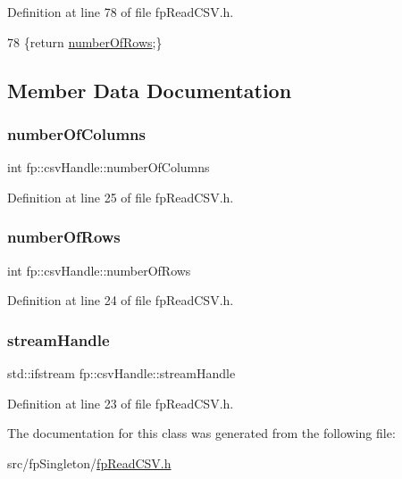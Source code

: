 Definition at line 78 of file fp\+Read\+C\+S\+V.\+h.


\begin{DoxyCode}
78 \{\textcolor{keywordflow}{return} \hyperlink{classfp_1_1csvHandle_a07cf6b14355c5fa81643a7bb6e9c681f}{numberOfRows};\}
\end{DoxyCode}


\subsection{Member Data Documentation}
\mbox{\label{classfp_1_1csvHandle_ae3e5280846df348d0b1b86b78f2e3682}} 
\subsubsection{\texorpdfstring{number\+Of\+Columns}{numberOfColumns}}
{\footnotesize\ttfamily int fp\+::csv\+Handle\+::number\+Of\+Columns\hspace{0.3cm}{\ttfamily [private]}}



Definition at line 25 of file fp\+Read\+C\+S\+V.\+h.

\mbox{\label{classfp_1_1csvHandle_a07cf6b14355c5fa81643a7bb6e9c681f}} 
\subsubsection{\texorpdfstring{number\+Of\+Rows}{numberOfRows}}
{\footnotesize\ttfamily int fp\+::csv\+Handle\+::number\+Of\+Rows\hspace{0.3cm}{\ttfamily [private]}}



Definition at line 24 of file fp\+Read\+C\+S\+V.\+h.

\mbox{\label{classfp_1_1csvHandle_a42c4ad8f38a95c724dfa2b173991a524}} 
\subsubsection{\texorpdfstring{stream\+Handle}{streamHandle}}
{\footnotesize\ttfamily std\+::ifstream fp\+::csv\+Handle\+::stream\+Handle\hspace{0.3cm}{\ttfamily [private]}}



Definition at line 23 of file fp\+Read\+C\+S\+V.\+h.



The documentation for this class was generated from the following file\+:\begin{DoxyCompactItemize}
\item 
src/fp\+Singleton/\hyperlink{fpReadCSV_8h}{fp\+Read\+C\+S\+V.\+h}\end{DoxyCompactItemize}
